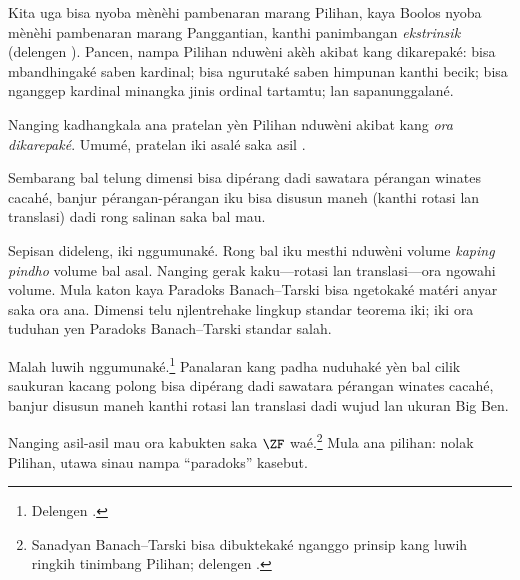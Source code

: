 \documentclass[../../../include/open-logic-section]{subfiles}
\begin{document}

Kita uga bisa nyoba mènèhi pambenaran marang Pilihan, kaya Boolos nyoba mènèhi pambenaran marang
Panggantian, kanthi panimbangan \emph{ekstrinsik} (delengen
). Pancen, nampa Pilihan nduwèni
akèh akibat kang dikarepaké: bisa mbandhingaké saben kardinal;
bisa ngurutaké saben himpunan kanthi becik; bisa nganggep kardinal
minangka jinis ordinal tartamtu; lan sapanunggalané.

Nanging kadhangkala ana pratelan yèn Pilihan nduwèni akibat kang
\emph{ora dikarepaké}. Umumé, pratelan iki asalé saka asil
\cite{BanachTarski1924}.

\begin{thm}
Sembarang bal telung dimensi bisa dipérang dadi sawatara pérangan
winates cacahé, banjur pérangan-pérangan iku bisa disusun maneh
(kanthi rotasi lan translasi) dadi rong salinan saka bal mau.
\end{thm}
\noindent
Sepisan dideleng, iki nggumunaké. Rong bal iku mesthi nduwèni volume
\emph{kaping pindho} volume bal asal. Nanging gerak kaku---rotasi
lan translasi---ora ngowahi volume. Mula katon kaya Paradoks
Banach--Tarski bisa ngetokaké matéri anyar saka ora ana.
Dimensi telu njlentrehake lingkup standar teorema iki; iki ora tuduhan yen Paradoks Banach--Tarski standar salah.

Malah luwih nggumunaké.\footnote{Delengen
\citet[Téoréma 3.12]{Wagon2016}.} Panalaran kang padha nuduhaké yèn
bal cilik saukuran kacang polong bisa dipérang dadi sawatara pérangan
winates cacahé, banjur disusun maneh kanthi rotasi lan translasi
dadi wujud lan ukuran Big Ben.

Nanging asil-asil mau ora kabukten saka $\ZF$ waé.\footnote{Sanadyan
Banach--Tarski bisa dibuktekaké nganggo prinsip kang luwih ringkih
tinimbang Pilihan; delengen \citet[303]{Wagon2016}.} Mula ana pilihan:
nolak Pilihan, utawa sinau nampa ``paradoks'' kasebut.
\end{document}
